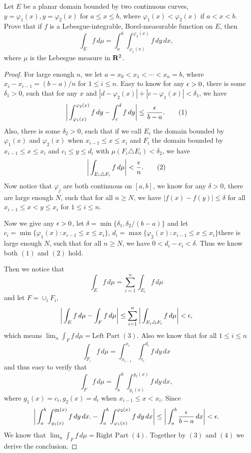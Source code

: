 \begin{pro}%
	Let $E$ be a planar domain bounded by two continuous curves, $y=\varphi_1(x),y=\varphi_2(x)$ for $a\leq x\leq b$, where $\varphi_1(x)<\varphi_2(x)$ if $a<x<b$. Prove that if $f$ is a Lebesgue-integrable, Borel-measurable function on $E$, then
	\[\int_E f\,d\mu=\int_a^b\int_{\varphi_1(x)}^{\varphi_2(x)} f\,dy\,dx,\]
	where $\mu$ is the Lebesgue measure in $\mathbf{R}^2$.
\end{pro}
\begin{proof}
	For large enough $n$, we let $a=x_0<x_1<\cdots<x_n=b$, where $x_{i}-x_{i-1}=(b-a)/n$ for $1\leq i\leq n$. Easy to know for any $\epsilon>0$, there is some $\delta_1>0$, such that for any $x$ and $|d-\varphi_2(x)|+|c-\varphi_1(x)|<\delta_1$, we have 
	\[\bigg|\int_{\varphi_1(x)}^{\varphi_2(x)} f\,dy-\int_c^d f\,dy\bigg|\leq \frac{\epsilon}{b-a}.\tag{1}\]
	Also, there is some $\delta_2>0$, such that if we call $E_i$ the domain bounded by $\varphi_1(x)$ and $\varphi_2(x)$ when $x_{i-1}\leq x\leq x_i$ and $F_i$ the domain bounded by $x_{i-1}\leq x\leq x_i$ and $c_i\leq y\leq d_i$ with $\mu(F_i\triangle E_i)<\delta_2$, we have 
	\[\bigg|\int_{E_i\triangle F_i} f\,d\mu\bigg|<\frac{\epsilon}{n}.\tag{2}\]
 	Now notice that $\varphi_j$ are both continuous on $[a,b]$, we know for any $\delta>0$, there are large enough $N$, such that for all $n\geq N$, we have $|f(x)-f(y)|\leq \delta$ for all $x_{i-1}\leq x<y\leq x_i$ for $1\leq i\leq n$. 

	Now we give any $\epsilon>0$, let $\delta=\min\{\delta_1,\delta_2/(b-a)\}$ and let $c_i=\min\{\varphi_1(x)\colon x_{i-1}\leq x\leq x_i\}$, $d_i=\max\{\varphi_2(x)\colon x_{i-1}\leq x\leq x_i\}$there is large enough $N$, such that for all $n
	\geq N$, we have $0<d_i-c_i<\delta$. Thus we know both $(1)$ and $(2)$ hold. 

	Then we notice that
	\[\int_E f\,d\mu=\sum_{i=1}^n \int_{E_i} f\,d\mu\]
	and let $F=\cup_i F_i$,
	\[\bigg|\int_E f\,d\mu-\int_F f\,d\mu\bigg|\leq \sum_{i=1}^n \bigg|\int_{E_i\triangle F_i} f\,d\mu\bigg|<\epsilon,\]
	which means $\lim_n \int_F f\,d\mu=\mbox{Left Part}\;(3).$
	Also we know that for all $1\leq i\leq n$
	\[\int_{F_i} f\,d\mu=\int_{x_{i-1}}^{x_i}\int_{c_i}^{d_i} f\,dy\,dx\]
	and thus easy to verify that
	\[\int_F f\,d\mu=\int_a^b\int_{g_1(x)}^{g_2(x)} f\,dy\,dx,\]
	where $g_1(x)=c_i, g_2(x)=d_i$ when $x_{i-1}\leq x<x_i$.
	Since
	\[\bigg|\int_a^b\int_{g_1(x)}^{g_2(x)} f\,dy\,dx.-\int_a^b\int_{\varphi_1(x)}^{\varphi_2(x)} f\,dy\,dx\bigg|\leq\bigg|\int_a^b \frac{\epsilon}{b-a}\,dx\bigg|<\epsilon.\]
	We know that $\lim_n\int_F f\,d\mu=\mbox{Right Part}\;(4).$ Together by $(3)$ and $(4)$ we derive the conclusion.
\end{proof}

